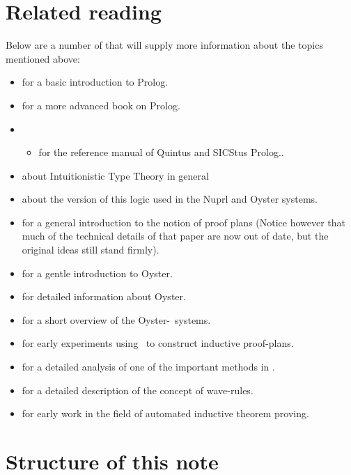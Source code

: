 \section {Related reading}
\label{readings}
Below are a number of  that will supply more
information about the topics mentioned above:
\begin{itemize}
\item \cite{primer} for a basic introduction to Prolog.     
\item \cite{artofprolog} for a more advanced book on Prolog.
\item \begin{itemize}
        \item \cite{quintus,sicstus} for the reference manual of
Quintus and SICStus Prolog..

\iffalse
\item \cite{swi} for the reference manual of \inx{SWI Prolog}.
\fi
\end{itemize}

\item \cite{martin-lof79} about Intuitionistic Type Theory in general
\item \cite{nuprl-book} about the version of this logic used in the
       Nuprl and Oyster systems.
\item \cite{pub349} for a general introduction to the notion of proof
       plans (Notice however that much of the technical details of
that paper are now out of date, but the original ideas still stand
firmly).
\item \cite{bb423} for a gentle introduction to Oyster.
\item \cite{wp214} for detailed information about Oyster.
\item \cite{oyster-clam} for a short overview of the Oyster-\clam\
       systems.
\item \cite{pub413} for early experiments using \clam\ to construct
       inductive proof-plans.
\item \cite{pub419} for a detailed analysis of one of the important
       methods in \clam.
\item \cite{pub459,pub567} for a detailed description of the concept of wave-rules.
\item \cite{boyerbook} for early work in the field of automated
       inductive theorem proving.
\end{itemize}

\section {Structure of this note}

